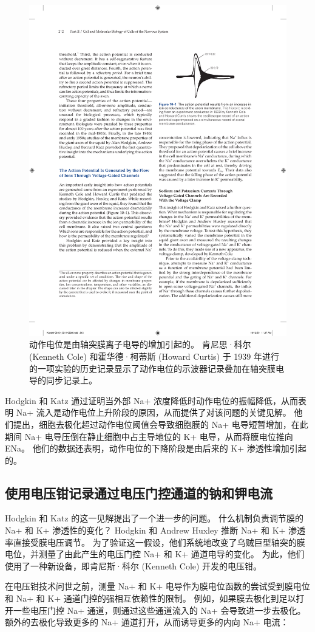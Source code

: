\begin{figure}[htbp]
	\centering
	\includegraphics[width=0.5\linewidth]{chap10/fig_10_1}
	\caption{动作电位是由轴突膜离子电导的增加引起的。 肯尼思·科尔 (Kenneth Cole) 和霍华德·柯蒂斯 (Howard Curtis) 于 1939 年进行的一项实验的历史记录显示了动作电位的示波器记录叠加在轴突膜电导的同步记录上。}
	\label{fig:10_1}
\end{figure}


Hodgkin 和 Katz 通过证明当外部 Na+ 浓度降低时动作电位的振幅降低，从而表明 Na+ 流入是动作电位上升阶段的原因，从而提供了对该问题的关键见解。
他们提出，细胞去极化超过动作电位阈值会导致细胞膜的 Na+ 电导短暂增加，在此期间 Na+ 电导压倒在静止细胞中占主导地位的 K+ 电导，从而将膜电位推向 ENa。 
他们的数据还表明，动作电位的下降阶段是由后来的 K+ 渗透性增加引起的。



\subsection{使用电压钳记录通过电压门控通道的钠和钾电流}

Hodgkin 和 Katz 的这一见解提出了一个进一步的问题。
什么机制负责调节膜的 Na+ 和 K+ 渗透性的变化？
Hodgkin 和 Andrew Huxley 推断 Na+ 和 K+ 渗透率直接受膜电压调节。
为了验证这一假设，他们系统地改变了乌贼巨型轴突的膜电位，并测量了由此产生的电压门控 Na+ 和 K+ 通道电导的变化。
为此，他们使用了一种新设备，即肯尼斯·科尔 (Kenneth Cole) 开发的电压钳。


在电压钳技术问世之前，测量 Na+ 和 K+ 电导作为膜电位函数的尝试受到膜电位和 Na+ 和 K+ 通道门控的强相互依赖性的限制。
例如，如果膜去极化到足以打开一些电压门控 Na+ 通道，则通过这些通道流入的 Na+ 会导致进一步去极化。 
额外的去极化导致更多的 Na+ 通道打开，从而诱导更多的内向 Na+ 电流：


